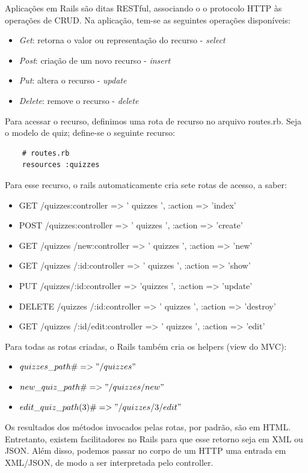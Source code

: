             Aplicações em Rails são ditas RESTful, associando o o protocolo \ac{HTTP} às operações de \ac{CRUD}. Na aplicação, tem-se as seguintes operações disponíveis:
\begin{itemize}
\item \emph{Get}: retorna o valor ou representação do recurso - \emph{select}
\item \emph{Post}: criação de um novo recurso - \emph{insert}
\item \emph{Put}: altera o recurso - \emph{update}
\item \emph{Delete}: remove o recurso - \emph{delete}
\end{itemize}     
    Para acessar o recurso, definimos uma rota de recurso no arquivo routes.rb. Seja o modelo de quiz; define-se o seguinte recurso:
\begin{lstlisting}
    # routes.rb
    resources :quizzes
 \end{lstlisting}      
    Para esse recurso, o rails automaticamente cria sete rotas de acesso, a saber:
\begin{itemize}
\item GET /quizzes:controller => ' quizzes ', :action => 'index'
\item POST /quizzes:controller => ' quizzes ', :action => 'create'
\item GET /quizzes /new:controller => ' quizzes ', :action => 'new'
\item GET /quizzes /:id:controller => ' quizzes ', :action => 'show'
\item PUT /quizzes/:id:controller => 'quizzes ', :action => 'update'
\item DELETE /quizzes /:id:controller => ' quizzes ', :action => 'destroy'
\item GET /quizzes /:id/edit:controller => ' quizzes ', :action => 'edit'
\end{itemize}     
    Para todas as rotas criadas, o Rails também cria os helpers (view do \ac{MVC}):
\begin{itemize}
\item    $quizzes\_path         \# => "/quizzes "$
\item    $new\_quiz\_path      \# => "/quizzes /new"$
\item    $edit\_quiz\_path(3)  \# => "/quizzes /3/edit"$
\end{itemize}     
     
    Os resultados dos métodos invocados pelas rotas, por padrão, são em \ac{HTML}. Entretanto, existem facilitadores no Rails para que esse retorno seja em \ac{XML} ou \ac{JSON}. Além disso, podemos passar no corpo de um \ac{HTTP} uma entrada em \ac{XML}/\ac{JSON}, de modo a ser interpretada pelo controller.
	
